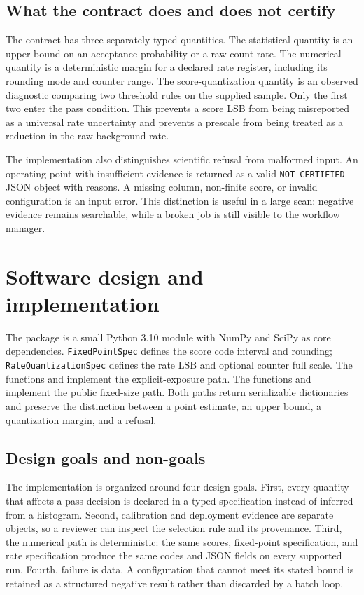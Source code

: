 \documentclass[submission, Phys]{SciPost}
\begin{document}
\subsection{What the contract does and does not certify}

The contract has three separately typed quantities.  The statistical quantity is
an upper bound on an acceptance probability or a raw count rate.  The numerical
quantity is a deterministic margin for a declared rate register, including its
rounding mode and counter range.  The score-quantization quantity is an observed
diagnostic comparing two threshold rules on the supplied sample.  Only the first
two enter the pass condition.  This prevents a score LSB from being misreported
as a universal rate uncertainty and prevents a prescale from being treated as a
reduction in the raw background rate.

The implementation also distinguishes scientific refusal from malformed input.
An operating point with insufficient evidence is returned as a valid
\verb|NOT_CERTIFIED| JSON object with reasons.  A missing column, non-finite
score, or invalid configuration is an input error.  This distinction is useful
in a large scan: negative evidence remains searchable, while a broken job is
still visible to the workflow manager.

\section{Software design and implementation}
\label{sec:implementation}

The package is a small Python 3.10 module with NumPy and SciPy as core
dependencies.  \texttt{FixedPointSpec} defines the score code interval and
rounding; \texttt{RateQuantizationSpec} defines the rate LSB and optional
counter full scale.  The functions  and
 implement the explicit-exposure path.  The functions
 and  implement the
public fixed-size path.  Both paths return serializable dictionaries and
preserve the distinction between a point estimate, an upper bound, a
quantization margin, and a refusal.

\subsection{Design goals and non-goals}

The implementation is organized around four design goals.  First, every
quantity that affects a pass decision is declared in a typed specification
instead of inferred from a histogram.  Second, calibration and deployment
evidence are separate objects, so a reviewer can inspect the selection rule
and its provenance.  Third, the numerical path is deterministic: the same
scores, fixed-point specification, and rate specification produce the same
codes and JSON fields on every supported run.  Fourth, failure is data.  A
configuration that cannot meet its stated bound is retained as a structured
negative result rather than discarded by a batch loop.
\end{document}
